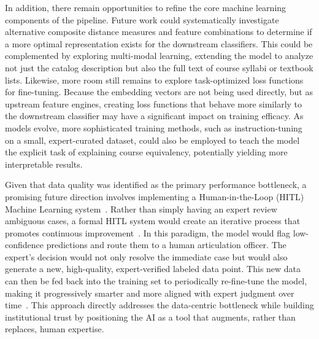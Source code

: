 In addition, there remain opportunities to refine the core machine learning components of the pipeline. Future work could systematically investigate alternative composite distance measures and feature combinations to determine if a more optimal representation exists for the downstream classifiers. This could be complemented by exploring multi-modal learning, extending the model to analyze not just the catalog description but also the full text of course syllabi or textbook lists. Likewise, more room still remains to explore task-optimized loss functions for fine-tuning.  Because the embedding vectors are not being used directly, but as upstream feature engines, creating loss functions that behave more similarly to the downstream classifier may have a significant impact on training efficacy.  As models evolve, more sophisticated training methods, such as instruction-tuning on a small, expert-curated dataset, could also be employed to teach the model the explicit task of explaining course equivalency, potentially yielding more interpretable results.

Given that data quality was identified as the primary performance bottleneck, a promising future direction involves implementing a Human-in-the-Loop (HITL) Machine Learning system~\cite{WU2022364}. Rather than simply having an expert review ambiguous cases, a formal HITL system would create an iterative process that promotes continuous improvement~\cite{10.5555/3061053.3061219,wang2019}. In this paradigm, the model would flag low-confidence predictions and route them to a human articulation officer. The expert's decision would not only resolve the immediate case but would also generate a new, high-quality, expert-verified labeled data point. This new data can then be fed back into the training set to periodically re-fine-tune the model, making it progressively smarter and more aligned with expert judgment over time~\cite{Settles2009ActiveLL,wang2022humanintheloopmachinelearningmacromicro}. This approach directly addresses the data-centric bottleneck while building institutional trust by positioning the AI as a tool that augments, rather than replaces, human expertise.

